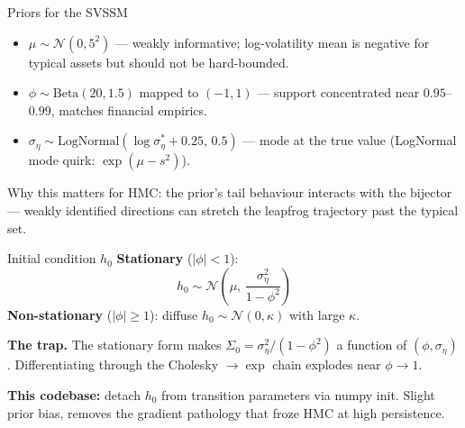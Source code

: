 \documentclass[10pt,aspectratio=169]{beamer}
\begin{document}
\begin{frame}{Priors for the SVSSM}
  \begin{itemize}
    \item $\mu \sim \mathcal{N}(0, 5^2)$ --- weakly informative; log-volatility mean is negative for typical assets but should not be hard-bounded.
    \item $\phi \sim \mathrm{Beta}(20, 1.5)$ mapped to $(-1, 1)$ --- support concentrated near $0.95$--$0.99$, matches financial empirics.
    \item $\sigma_\eta \sim \mathrm{LogNormal}(\log\sigma_\eta^* + 0.25,\, 0.5)$ --- mode at the true value (LogNormal mode quirk: $\exp(\mu - s^2)$).
  \end{itemize}

  \medskip
  Why this matters for HMC: the prior's tail behaviour interacts with the bijector --- weakly identified directions can stretch the leapfrog trajectory past the typical set.
\end{frame}

\begin{frame}{Initial condition $h_0$}
  \textbf{Stationary} ($|\phi| < 1$):
  \[
    h_0 \sim \mathcal{N}\!\left(\mu,\, \frac{\sigma_\eta^2}{1 - \phi^2}\right)
  \]
  \textbf{Non-stationary} ($|\phi| \ge 1$): diffuse $h_0 \sim \mathcal{N}(0, \kappa)$ with large $\kappa$.

  \medskip
  \textbf{The trap.} The stationary form makes $\Sigma_0 = \sigma_\eta^2 / (1{-}\phi^2)$ a function of $(\phi, \sigma_\eta)$. Differentiating through the Cholesky $\to \exp$ chain explodes near $\phi \to 1$.

  \medskip
  \textbf{This codebase:} detach $h_0$ from transition parameters via numpy init. Slight prior bias, removes the gradient pathology that froze HMC at high persistence.
\end{frame}

\end{document}
